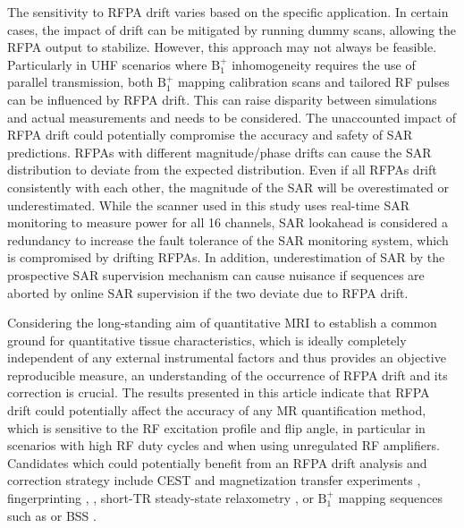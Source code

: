The sensitivity to RFPA drift varies based on the specific application. In certain cases, the impact of drift can be mitigated by running dummy scans, allowing the RFPA output to stabilize. However, this approach may not always be feasible. Particularly in UHF scenarios where $\mathrm{B_{1}^{+}}$ inhomogeneity requires the use of parallel transmission, both $\mathrm{B_{1}^{+}}$ mapping calibration scans and tailored RF pulses can be influenced by RFPA drift. This can raise disparity between simulations and actual measurements and needs to be considered. The unaccounted impact of RFPA drift could potentially compromise the accuracy and safety of SAR predictions. RFPAs with different magnitude/phase drifts can cause the SAR distribution to deviate from the expected distribution. Even if all RFPAs drift consistently with each other, the magnitude of the SAR will be overestimated or underestimated. While the scanner used in this study uses real-time SAR monitoring to measure power for all 16 channels, SAR lookahead is considered a redundancy to increase the fault tolerance of the SAR monitoring system, which is compromised by drifting RFPAs. In addition, underestimation of SAR by the prospective SAR supervision mechanism can cause nuisance if sequences are aborted by online SAR supervision if the two deviate due to RFPA drift.

Considering the long-standing aim of quantitative MRI to establish a common ground for quantitative tissue characteristics, which is ideally completely independent of any external instrumental factors and thus provides an objective reproducible measure, an understanding of the occurrence of RFPA drift and its correction is crucial. The results presented in this article indicate that RFPA drift could potentially affect the accuracy of any MR quantification method, which is sensitive to the RF excitation profile and flip angle, in particular in scenarios with high RF duty cycles and when using unregulated RF amplifiers. Candidates which could potentially benefit from an RFPA drift analysis and correction strategy include CEST and magnetization transfer experiments \cite{VanZijl2018}, fingerprinting \cite{Ma2017},  \cite{Sbrizzi2018}, short-TR steady-state relaxometry \cite{Deoni2007, weiskopf2013quantitative, Nguyen2017, Shcherbakova2018, Heule2014}, or $\mathrm{B_{1}^{+}}$ mapping sequences such as  or BSS \cite{Sacolick2010}. 

